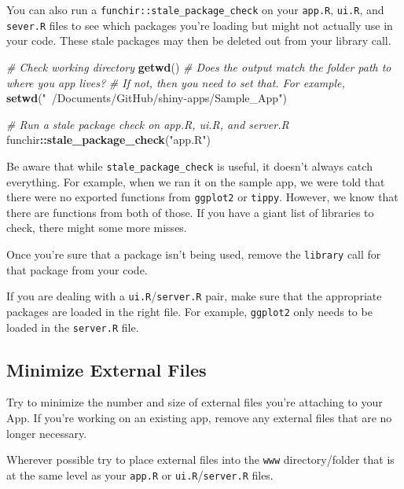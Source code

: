 \documentclass[
]{book}
\newenvironment{Shaded}{\begin{snugshade}}{\end{snugshade}}
\newcommand{\CommentTok}[1]{\textcolor[rgb]{0.56,0.35,0.01}{\textit{#1}}}
\newcommand{\KeywordTok}[1]{\textcolor[rgb]{0.13,0.29,0.53}{\textbf{#1}}}
\newcommand{\NormalTok}[1]{#1}
\newcommand{\OperatorTok}[1]{\textcolor[rgb]{0.81,0.36,0.00}{\textbf{#1}}}
\newcommand{\StringTok}[1]{\textcolor[rgb]{0.31,0.60,0.02}{#1}}
\begin{document}
You can also run a \texttt{funchir::stale\_package\_check} on your \texttt{app.R}, \texttt{ui.R}, and \texttt{sever.R} files to see which packages you're loading but might not actually use in your code. These stale packages may then be deleted out from your library call.

\begin{Shaded}
\begin{Highlighting}[]
\CommentTok{# Check working directory}
\KeywordTok{getwd}\NormalTok{()}
\CommentTok{# Does the output match the folder path to where you app lives?}
\CommentTok{# If not, then you need to set that. For example,}
\KeywordTok{setwd}\NormalTok{(}\StringTok{"~/Documents/GitHub/shiny-apps/Sample_App"}\NormalTok{)}

\CommentTok{# Run a stale package check on app.R, ui.R, and server.R}
\NormalTok{funchir}\OperatorTok{::}\KeywordTok{stale_package_check}\NormalTok{(}\StringTok{"app.R"}\NormalTok{)}
\end{Highlighting}
\end{Shaded}

Be aware that while \texttt{stale\_package\_check} is useful, it doesn't always catch everything. For example, when we ran it on the sample app, we were told that there were no exported functions from \texttt{ggplot2} or \texttt{tippy}. However, we know that there are functions from both of those. If you have a giant list of libraries to check, there might some more misses.

Once you're sure that a package isn't being used, remove the \texttt{library} call for that package from your code.

If you are dealing with a \texttt{ui.R}/\texttt{server.R} pair, make sure that the appropriate packages are loaded in the right file. For example, \texttt{ggplot2} only needs to be loaded in the \texttt{server.R} file.

\hypertarget{exFilesb}{%
\subsection{Minimize External Files}\label{exFilesb}}

Try to minimize the number and size of external files you're attaching to your App. If you're working on an existing app, remove any external files that are no longer necessary.

Wherever possible try to place external files into the \texttt{www} directory/folder that is at the same level as your \texttt{app.R} or \texttt{ui.R}/\texttt{server.R} files.
\end{document}
